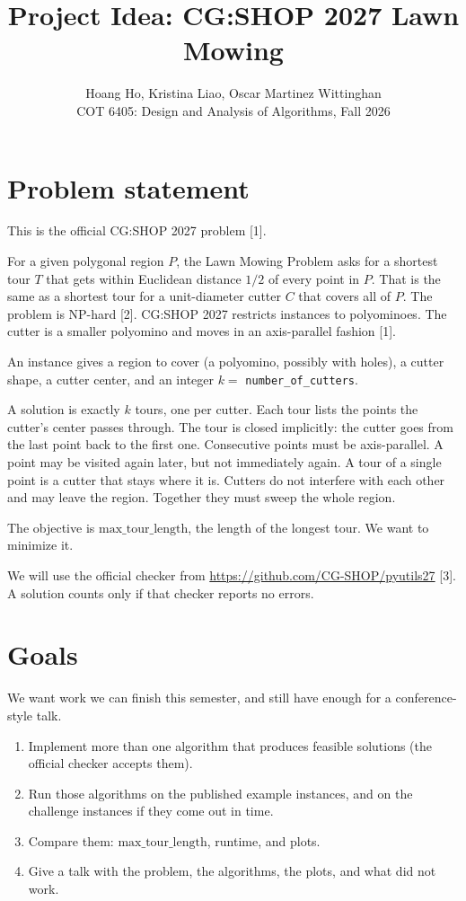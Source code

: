 \documentclass[11pt]{article}
\title{Project Idea: CG:SHOP 2027 Lawn Mowing}
\author{Hoang Ho, Kristina Liao, Oscar Martinez Wittinghan\\
COT 6405: Design and Analysis of Algorithms, Fall 2026}
\date{}
\begin{document}
\maketitle

\section{Problem statement}

This is the official CG:SHOP 2027 problem [1].

For a given polygonal region $P$, the Lawn Mowing Problem asks for a
shortest tour $T$ that gets within Euclidean distance $1/2$ of every
point in $P$. That is the same as a shortest tour for a unit-diameter
cutter $C$ that covers all of $P$. The problem is NP-hard [2].
CG:SHOP 2027 restricts instances to polyominoes. The cutter is a
smaller polyomino and moves in an axis-parallel fashion [1].

An instance gives a region to cover (a polyomino, possibly with holes),
a cutter shape, a cutter center, and an integer $k =$
\texttt{number\_of\_cutters}.

A solution is exactly $k$ tours, one per cutter.
Each tour lists the points the cutter's center passes through.
The tour is closed implicitly: the cutter goes from the last point back
to the first one.
Consecutive points must be axis-parallel.
A point may be visited again later, but not immediately again.
A tour of a single point is a cutter that stays where it is.
Cutters do not interfere with each other and may leave the region.
Together they must sweep the whole region.

The objective is $\mathrm{max\_tour\_length}$, the length of the
longest tour. We want to minimize it.

We will use the official checker from
\url{https://github.com/CG-SHOP/pyutils27} [3].
A solution counts only if that checker reports no errors.

\section{Goals}

We want work we can finish this semester, and still have enough for a
conference-style talk.

\begin{enumerate}
\item Implement more than one algorithm that produces feasible
      solutions (the official checker accepts them).
\item Run those algorithms on the published example instances, and on
      the challenge instances if they come out in time.
\item Compare them: $\mathrm{max\_tour\_length}$, runtime, and plots.
\item Give a talk with the problem, the algorithms, the plots, and
      what did not work.
\end{enumerate}
\end{document}
